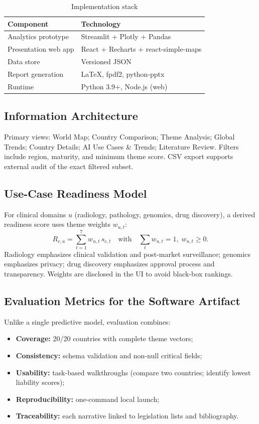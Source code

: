 \begin{table}[htbp]
\centering
\caption{Implementation stack}
\label{tab:stack}
\begin{tabular}{@{}ll@{}}
\toprule
\textbf{Component} & \textbf{Technology} \\
\midrule
Analytics prototype & Streamlit + Plotly + Pandas \\
Presentation web app & React + Recharts + react-simple-maps \\
Data store & Versioned JSON \\
Report generation & LaTeX, fpdf2, python-pptx \\
Runtime & Python 3.9+, Node.js (web) \\
\bottomrule
\end{tabular}
\end{table}

\subsection{Information Architecture}

Primary views: World Map; Country Comparison; Theme Analysis; Global Trends; Country Details; AI Use Cases \& Trends; Literature Review. Filters include region, maturity, and minimum theme score. CSV export supports external audit of the exact filtered subset.

\subsection{Use-Case Readiness Model}

For clinical domains $u$ (radiology, pathology, genomics, drug discovery), a derived readiness score uses theme weights $w_{u,t}$:
\begin{equation}
\label{eq:usecase}
R_{c,u} = \sum_{t=1}^{7} w_{u,t} \, s_{c,t}
\quad \text{with} \quad \sum_t w_{u,t} = 1, \; w_{u,t} \ge 0.
\end{equation}
Radiology emphasizes clinical validation and post-market surveillance; genomics emphasizes privacy; drug discovery emphasizes approval process and transparency. Weights are disclosed in the UI to avoid black-box rankings.

\subsection{Evaluation Metrics for the Software Artifact}

Unlike a single predictive model, evaluation combines:
\begin{itemize}[noitemsep]
  \item \textbf{Coverage:} 20/20 countries with complete theme vectors;
  \item \textbf{Consistency:} schema validation and non-null critical fields;
  \item \textbf{Usability:} task-based walkthroughs (compare two countries; identify lowest liability scores);
  \item \textbf{Reproducibility:} one-command local launch;
  \item \textbf{Traceability:} each narrative linked to legislation lists and bibliography.
\end{itemize}

